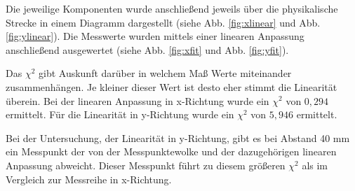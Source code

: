 Die jeweilige Komponenten wurde anschließend jeweils über die physikalische Strecke in einem Diagramm dargestellt (siehe Abb. \ref{fig:xlinear} und Abb. \ref{fig:ylinear}). 
Die Messwerte wurden mittels einer linearen Anpassung anschließend ausgewertet (siehe Abb. \ref{fig:xfit} und Abb. \ref{fig:yfit}).

Das \(\chi^2\) gibt Auskunft darüber in welchem Maß Werte miteinander zusammenhängen. 
Je kleiner dieser Wert ist desto eher stimmt die Linearität überein. Bei der linearen Anpassung in x-Richtung wurde ein \(\chi^2\) von \(0,294\) ermittelt. Für die Linearität in y-Richtung wurde ein \(\chi^2\) von \(5,946\) ermittelt.

Bei der Untersuchung, der Linearität in y-Richtung, gibt es bei Abstand 40 mm ein Messpunkt der von der Messpunktewolke und der dazugehörigen linearen Anpassung abweicht. Dieser Messpunkt führt zu diesem größeren \(\chi^2\) als im Vergleich zur Messreihe  in x-Richtung.

